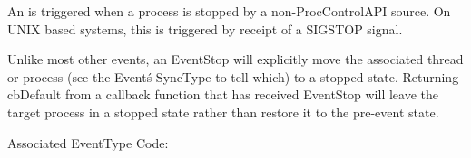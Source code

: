 
An  is triggered when a process is stopped by a
non-ProcControlAPI source. On UNIX based systems, this is triggered by receipt
of a SIGSTOP signal.

Unlike most other events, an EventStop will explicitly move the associated
thread or process (see the Event\'s SyncType to tell which) to a stopped state.
Returning cbDefault from a callback function that has received EventStop will
leave the target process in a stopped state rather than restore it to the
pre-event state.

Associated EventType Code: 
